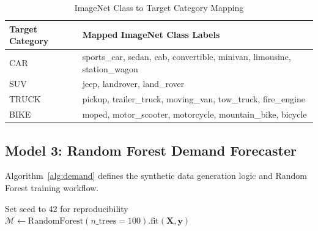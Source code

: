 \documentclass[conference,10pt]{IEEEtran}
\begin{document}
\begin{table}[ht]
\centering
\caption{ImageNet Class to Target Category Mapping}
\label{tab:vmap}
\footnotesize
\begin{tabular}{@{}l l@{}}
\toprule
\textbf{Target Category} & \textbf{Mapped ImageNet Class Labels} \\
\midrule
CAR & sports\_car, sedan, cab, convertible, minivan, limousine, station\_wagon \\
SUV & jeep, landrover, land\_rover \\
TRUCK & pickup, trailer\_truck, moving\_van, tow\_truck, fire\_engine \\
BIKE & moped, motor\_scooter, motorcycle, mountain\_bike, bicycle \\
\bottomrule
\end{tabular}
\end{table}

\subsection{Model 3: Random Forest Demand Forecaster}

Algorithm~\ref{alg:demand} defines the synthetic data generation logic and Random Forest training workflow.

\begin{algorithm}[ht]
\DontPrintSemicolon
\caption{Synthetic Demand Training \& Forecasting}
\label{alg:demand}
\small
{}
Set seed to 42 for reproducibility\;
$\mathcal{M} \leftarrow \text{RandomForest}(n\_\text{trees}=100).\text{fit}(\mathbf{X}, \mathbf{y})$\;
\end{algorithm}
\end{document}
